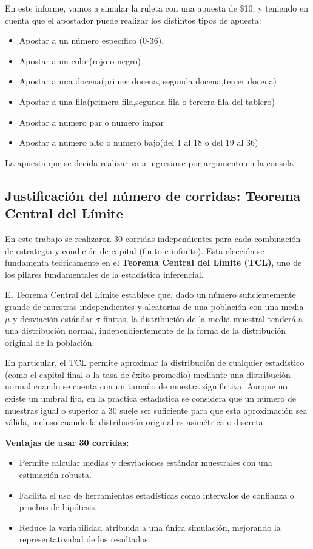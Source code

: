 \documentclass{article}
\begin{document}
En este informe, vamos a simular la ruleta con una apuesta de \$10, y teniendo en cuenta que el apostador puede realizar los distintos tipos de apuesta:
\begin{itemize}
    \item Apostar a un número específico (0-36).
    \item Apostar a un color(rojo o negro)
    \item Apostar a una docena(primer docena, segunda docena,tercer docena)
    \item Apostar a una fila(primera fila,segunda fila o tercera fila del tablero)
    \item Apostar a numero par o numero impar
    \item Apostar a numero alto o numero bajo(del 1 al 18 o del 19 al 36)
\end{itemize}
La apuesta que se decida realizar va a ingresarse por argumento en la consola
\subsection{Justificación del número de corridas: Teorema Central del Límite}

En este trabajo se realizaron 30 corridas independientes para cada combinación de estrategia y condición de capital (finito e infinito). Esta elección se fundamenta teóricamente en el \textbf{Teorema Central del Límite (TCL)}, uno de los pilares fundamentales de la estadística inferencial.

El Teorema Central del Límite establece que, dado un número suficientemente grande de muestras independientes y aleatorias de una población con una media $\mu$ y desviación estándar $\sigma$ finitas, la distribución de la media muestral tenderá a una distribución normal, independientemente de la forma de la distribución original de la población.

En particular, el TCL permite aproximar la distribución de cualquier estadístico (como el capital final o la tasa de éxito promedio) mediante una distribución normal cuando se cuenta con un tamaño de muestra significtiva. Aunque no existe un umbral fijo, en la práctica estadística se considera que un número de muestras igual o superior a 30 suele ser suficiente para que esta aproximación sea válida, incluso cuando la distribución original es asimétrica o discreta.

\noindent
\textbf{Ventajas de usar 30 corridas:}
\begin{itemize}
    \item Permite calcular medias y desviaciones estándar muestrales con una estimación robusta.
    \item Facilita el uso de herramientas estadísticas como intervalos de confianza o pruebas de hipótesis.
    \item Reduce la variabilidad atribuida a una única simulación, mejorando la representatividad de los resultados.
\end{itemize}
\end{document}
